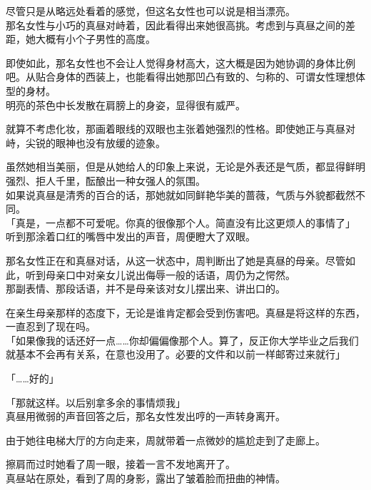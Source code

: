 尽管只是从略远处看着的感觉，但这名女性也可以说是相当漂亮。\\

那名女性与小巧的真昼对峙着，因此看得出来她很高挑。考虑到与真昼之间的差距，她大概有小个子男性的高度。

即使如此，那名女性也不会让人觉得身材高大，这大概是因为她协调的身体比例吧。从贴合身体的西装上，也能看得出她那凹凸有致的、匀称的、可谓女性理想体型的身材。\\

明亮的茶色中长发散在肩膀上的身姿，显得很有威严。

就算不考虑化妆，那画着眼线的双眼也主张着她强烈的性格。即使她正与真昼对峙，尖锐的眼神也没有放缓的迹象。

虽然她相当美丽，但是从她给人的印象上来说，无论是外表还是气质，都显得鲜明强烈、拒人千里，酝酿出一种女强人的氛围。\\

如果说真昼是清秀的百合的话，那她就如同鲜艳华美的蔷薇，气质与外貌都截然不同。\\

「真是，一点都不可爱呢。你真的很像那个人。简直没有比这更烦人的事情了」\\

听到那涂着口红的嘴唇中发出的声音，周便瞪大了双眼。

那名女性正在和真昼对话，从这一状态中，周判断出了她是真昼的母亲。尽管如此，听到母亲口中对亲女儿说出侮辱一般的话语，周仍为之愕然。\\

那副表情、那段话语，并不是母亲该对女儿摆出来、讲出口的。

在亲生母亲那样的态度下，无论是谁肯定都会受到伤害吧。真昼是将这样的东西，一直忍到了现在吗。\\

「如果像我的话还好一点……你却偏偏像那个人。算了，反正你大学毕业之后我们就基本不会再有关系，在意也没用了。必要的文件和以前一样邮寄过来就行」

「……好的」

「那就这样。以后别拿多余的事情烦我」\\

真昼用微弱的声音回答之后，那名女性发出哼的一声转身离开。

由于她往电梯大厅的方向走来，周就带着一点微妙的尴尬走到了走廊上。

擦肩而过时她看了周一眼，接着一言不发地离开了。\\

真昼站在原处，看到了周的身影，露出了皱着脸而扭曲的神情。\\

